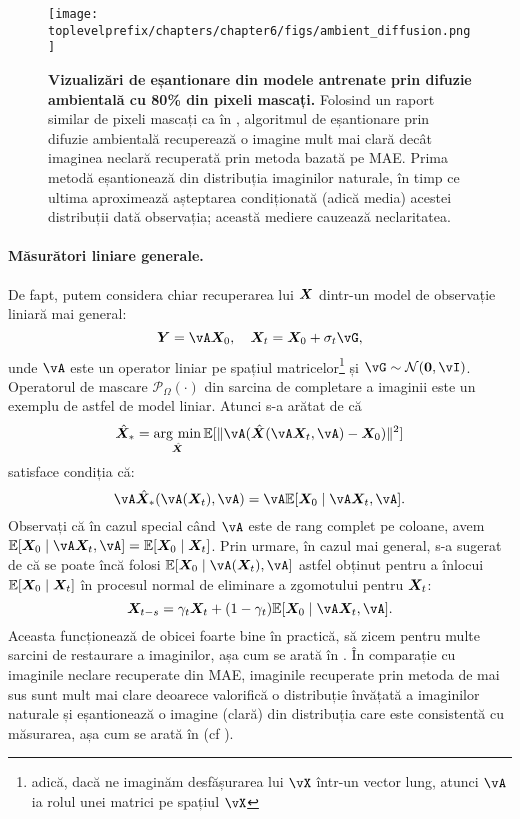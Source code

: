 \documentclass[../../book-main_ro.tex]{subfiles}
\begin{document}
\begin{figure}
  \centering
  \texttt{[image: \\toplevelprefix/chapters/chapter6/figs/ambient\_diffusion.png]}
  \caption{\small \textbf{Vizualizări de eșantionare din modele antrenate prin difuzie ambientală \cite{Daras-NIPS2023} cu 80\% din pixeli mascați.} Folosind un raport similar de pixeli mascați ca în , algoritmul de eșantionare prin difuzie ambientală recuperează o imagine mult mai clară decât imaginea neclară recuperată prin metoda bazată pe MAE. Prima metodă eșantionează din distribuția imaginilor naturale, în timp ce ultima aproximează așteptarea condiționată (adică media) acestei distribuții dată observația; această mediere cauzează neclaritatea.}
  \label{fig:ambient_diffusion}
\end{figure}

\paragraph{Măsurători liniare generale.} 
De fapt, putem considera chiar recuperarea lui $\bm{X}$ dintr-un model de observație liniară mai general:
\begin{equation}
    \Y = \vA\X_0,  \quad \X_t = \X_0 + \sigma_t \vG,  
\end{equation}
unde $\vA$ este un operator liniar pe spațiul matricelor\footnote{adică, dacă ne imaginăm desfășurarea lui \(\vX\) într-un vector lung, atunci \(\vA\) ia rolul unei matrici pe spațiul \(\vX\)} și $\vG \sim \mathcal{N}(\boldsymbol{0}, \vI)$. Operatorul de mascare $\mathcal{P}_{\Omega}(\cdot)$ din sarcina de completare a imaginii este un exemplu de astfel de model liniar. Atunci s-a arătat de \cite{daras2023ambient} că 
\begin{equation}
    \hat{\X}_* = \argmin_{\hat{\X}} \mathbb{E}[\|\vA(\hat{\X}(\vA\X_t, \vA) - \X_0)\|^2]
\end{equation}
satisface condiția că:
\begin{equation}
    \vA \hat{\X}_*(\vA(\X_t), \vA) = \vA \mathbb{E}[\X_0 \mid \vA \X_t, \vA].
\end{equation} Observați că în cazul special când $\vA$ este de rang complet pe coloane, avem $ \mathbb{E}[\X_0 \mid \vA\X_t, \vA] = \mathbb{E}[\X_0 \mid \X_t]$. Prin urmare, în cazul mai general, s-a sugerat de \cite{daras2023ambient} că se poate încă folosi $\mathbb{E}[\X_0 \mid \vA(\X_t), \vA]$ astfel obținut pentru a înlocui $\mathbb{E}[\bm{X}_0 \mid \bm{X}_t]$ în procesul normal de eliminare a zgomotului pentru $\bm{X}_t$:
\begin{equation}
    \X_{t-s} = \gamma_t \X_t + (1-\gamma_t) \mathbb{E}[\X_0 \mid \vA\X_t, \vA].
\end{equation}
Aceasta funcționează de obicei foarte bine în practică, să zicem pentru multe sarcini de restaurare a imaginilor, așa cum se arată în \cite{daras2023ambient}. În comparație cu imaginile neclare recuperate din MAE, imaginile recuperate prin metoda de mai sus sunt mult mai clare deoarece valorifică o distribuție învățată a imaginilor naturale și eșantionează o imagine (clară) din distribuția care este consistentă cu măsurarea, așa cum se arată în  (cf ).
\end{document}
